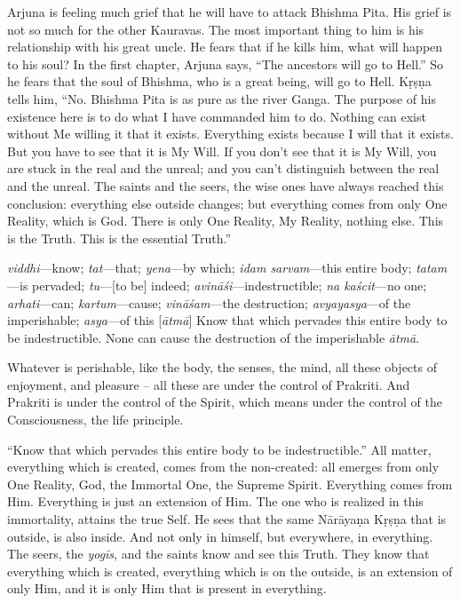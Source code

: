 Arjuna is feeling much grief that he will have to attack Bhishma Pita. His grief is not so much for the other Kauravas. The most important thing to him is his relationship with his great uncle. He fears that if he kills him, what will happen to his soul? In the first chapter, Arjuna says, “The ancestors will go to Hell.” So he fears that the soul of Bhishma, who is a great being, will go to Hell. Kṛṣṇa tells him, “No. Bhishma Pita is as pure as the river Ganga. The purpose of his existence here is to do what I have commanded him to do. Nothing can exist without Me willing it that it exists. Everything exists because I will that it exists. But you have to see that it is My Will. If you don’t see that it is My Will, you are stuck in the real and the unreal; and you can’t distinguish between the real and the unreal. The saints and the seers, the wise ones have always reached this conclusion: everything else outside changes; but everything comes from only One Reality, which is God. There is only One Reality, My Reality, nothing else. This is the Truth. This is the essential Truth.”

{%
  \textit{viddhi}---know; 
  \textit{tat}---that; 
  \textit{yena}---by which; 
  \textit{idam sarvam}---this entire body; 
  \textit{tatam}---is pervaded; 
  \textit{tu}---[to be] indeed; 
  \textit{avināśi}---indestructible; 
  \textit{na kaścit}---no one; 
  \textit{arhati}---can; 
  \textit{kartum}---cause; 
  \textit{vināśam}---the destruction; 
  \textit{avyayasya}---of the imperishable; 
  \textit{asya}---of this [\textit{ātmā}]
}
{%
  Know that which pervades this entire body to be indestructible. None can cause the destruction of the imperishable \textit{ātmā}.
}

Whatever is perishable, like the body, the senses, the mind, all these objects of enjoyment, and pleasure – all these are under the control of Prakriti. And Prakriti is under the control of the Spirit, which means under the control of the Consciousness, the life principle.

“Know that which pervades this entire body to be indestructible.” All matter, everything which is created, comes from the non-created: all emerges from only One Reality, God, the Immortal One, the Supreme Spirit. Everything comes from Him. Everything is just an extension of Him. The one who is realized in this immortality, attains the true Self. He sees that the same Nārāyaṇa Kṛṣṇa that is outside, is also inside. And not only in himself, but everywhere, in everything. The seers, the \textit{yogīs}, and the saints know and see this Truth. They know that everything which is created, everything which is on the outside, is an extension of only Him, and it is only Him that is present in everything.

